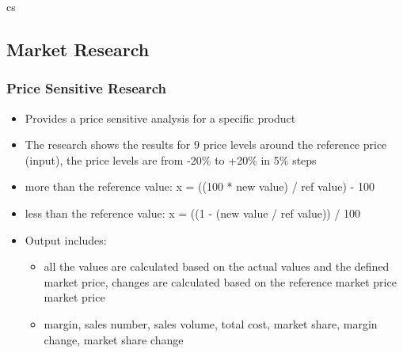 \gls{cs} %
\subsection{Market Research}
\subsubsection{Price Sensitive Research}
    \begin{itemize}
        \item Provides a price sensitive analysis for a specific product
        \item The research shows the results for 9 price levels around the reference price (input), the price levels are from -20\% to +20\% in 5\% steps
        \item more than the reference value: x = ((100 * new value) / ref value) - 100
        \item less than the reference value: x = ((1 - (new value / ref value)) / 100
        \item Output includes: 
        \begin{itemize}
            \item all the values are calculated based on the actual values and the defined market price, changes are calculated based on the reference market price 
            market price
            \item margin, sales number, sales volume, total cost, market share, margin change, market share change
        \end{itemize}
        \end{itemize}
       

